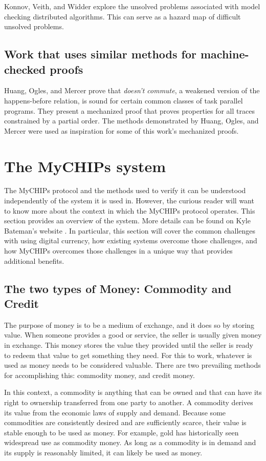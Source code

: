 \documentclass[runningheads]{llncs}
\begin{document}
 Konnov, Veith, and Widder explore the unsolved problems associated with model checking distributed algorithms. This can serve as a hazard map of difficult unsolved problems.\cite{Konnov}

\subsection{Work that uses similar methods for machine-checked proofs}
 Huang, Ogles, and Mercer prove that \emph{doesn't commute}, a weakened version of the happens-before relation, is sound for certain common classes of task parallel programs. They present a mechanized proof that proves properties for all traces constrained by a partial order. The methods demonstrated by Huang, Ogles, and Mercer were used as inspiration for some of this work's mechanized proofs. \cite{ben_DC}
 

\appendix

\section{The MyCHIPs system}
\label{apdx:mychips}
The MyCHIPs protocol and the methods used to verify it can be understood independently of the system it is used in. However, the curious reader will want to know more about the context in which the MyCHIPs protocol operates. This section provides an overview of the system. More details can be found on Kyle Bateman's website \cite{bateman_myCHIPs}. 
In particular, this section will cover the common challenges with using digital currency, how existing systems overcome those challenges, and how MyCHIPs overcomes those challenges in a unique way that provides additional benefits. 

\subsection{The two types of Money: Commodity and Credit}
The purpose of money is to be a medium of exchange, and it does so by storing value. When someone provides a good or service, the seller is usually given money in exchange. This money stores the value they provided until the seller is ready to redeem that value to get something they need.
For this to work, whatever is used as money needs to be considered valuable. There are two prevailing methods for accomplishing this: commodity money, and credit money. 

In this context, a commodity is anything that can be owned and that can have its right to ownership transferred from one party to another. A commodity derives its value from the economic laws of supply and demand. Because some commodities are consistently desired and are sufficiently scarce, their value is stable enough to be used as money. For example, gold has historically seen widespread use as commodity money. As long as a commodity is in demand and its supply is reasonably limited, it can likely be used as money.
\end{document}
